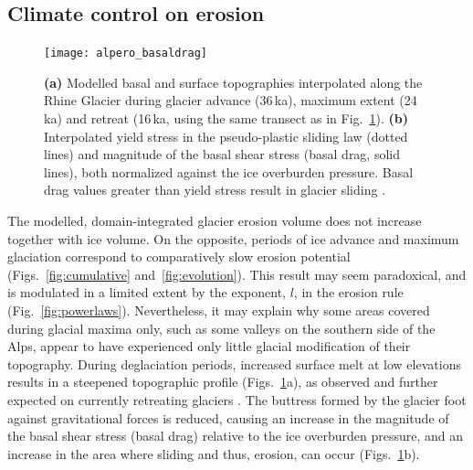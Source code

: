 \documentclass[esurf, manuscript]{copernicus}
\begin{document}
\subsection{Climate control on erosion}

    \begin{figure}
      \centerline{\texttt{[image: alpero\_basaldrag]}}
      \caption{%
        \textbf{(a)} Modelled basal and surface topographies interpolated along
        the Rhine Glacier during glacier advance (36\,ka), maximum extent
        (24\,ka) and retreat (16\,ka, using the same transect as in
        Fig.~\ref{fig:basaldrag}).
        \textbf{(b)} Interpolated yield stress in the pseudo-plastic sliding law
        (dotted lines) and magnitude of the basal shear stress (basal drag,
        solid lines), both normalized against the ice overburden pressure.
        Basal drag values greater than yield stress result in glacier sliding
        \citep[cf.][for model physics]{Seguinot.2014, Seguinot.etal.2016}.}
      \label{fig:basaldrag}
    \end{figure}

    The modelled, domain-integrated glacier erosion volume does not increase
    together with ice volume. On the opposite, periods of ice advance and
    maximum glaciation correspond to comparatively slow erosion potential
    (Figs.~\ref{fig:cumulative} and~\ref{fig:evolution}).
    This result may seem paradoxical, and is modulated in a limited extent by
    the exponent, $l$, in the erosion rule (Fig.~\ref{fig:powerlaws}).
    Nevertheless, it may explain why some areas covered during glacial maxima
    only, such as some valleys on the southern side of the Alps, appear to have
    experienced only little glacial modification of their topography.
    During deglaciation periods, increased surface melt at low elevations
    results in a steepened topographic profile (Figs.~\ref{fig:basaldrag}a),
    as observed and further expected on currently retreating glaciers
    \citep{Huss.etal.2010, Zekollari.Huybrechts.2015}.
    The buttress formed by the glacier foot against gravitational forces is
    reduced, causing an increase in the magnitude of the basal shear stress
    (basal drag) relative to the ice overburden pressure, and an increase in
    the area where sliding and thus, erosion, can occur
    (Figs.~\ref{fig:basaldrag}b).
\end{document}
